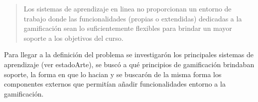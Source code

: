     \begin{quote}
    \colorbox{blue!05}{\parbox{\dimexpr\linewidth-2\fboxsep}{\strut%
        Los sistemas de aprendizaje en linea no proporcionan un entorno
        de trabajo donde las funcionalidades (propias o extendidas) dedicadas
        a la gamificación sean lo suficientemente flexibles para brindar un
        mayor soporte a los objetivos del curso.
    \strut}}%
    \end{quote}

\noindent Para llegar a la definición del problema se investigarón los principales sistemas de aprendizaje
(ver estadoArte), se buscó a qué principios de gamificación brindaban soporte, la forma en que lo hacian y
se buscarón de la misma forma los componentes externos que permitían añadir funcionalidades entorno a la
gamificación.





